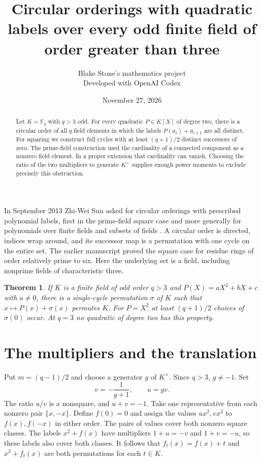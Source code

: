 \documentclass[11pt]{article}
\title{Circular orderings with quadratic labels over every odd finite field of order greater than three}
\author{Blake Stone's mathematics project\\\small Developed with OpenAI Codex}
\date{November 27, 2026}
\newtheorem{theorem}{Theorem}
\newcommand{\F}{\mathbb F}
\begin{document}
\maketitle
\begin{abstract}
Let $K=\F_q$ with $q>3$ odd. For every quadratic $P\in K[X]$ of degree two, there is a circular order of all $q$ field elements in which the labels $P(a_i)+a_{i+1}$ are all distinct. For squaring we construct full cycles with at least $(q+1)/2$ distinct successors of zero. The prime-field construction used the cardinality of a connected component as a nonzero field element. In a proper extension that cardinality can vanish. Choosing the ratio of the two multipliers to generate $K^\times$ supplies enough power moments to exclude precisely this obstruction.
\end{abstract}

In September 2013 Zhi-Wei Sun asked for circular orderings with prescribed polynomial labels, first in the prime-field square case and more generally for polynomials over finite fields and subsets of fields \cite{sun,oeis}. A circular order is directed, indices wrap around, and its successor map is a permutation with one cycle on the entire set. The earlier manuscript \cite{prime} proved the square case for residue rings of order relatively prime to six. Here the underlying set is a field, including nonprime fields of characteristic three.

\begin{theorem}\label{th:main}
If $K$ is a finite field of odd order $q>3$ and $P(X)=aX^2+bX+c$ with $a\ne0$, there is a single-cycle permutation $\sigma$ of $K$ such that $x\mapsto P(x)+\sigma(x)$ permutes $K$. For $P=X^2$ at least $(q+1)/2$ choices of $\sigma(0)$ occur. At $q=3$ no quadratic of degree two has this property.
\end{theorem}

\section*{The multipliers and the translation}
Put $m=(q-1)/2$ and choose a generator $g$ of $K^\times$. Since $q>3$, $g\ne-1$. Set
\[
 v=-\frac1{g+1},\qquad u=gv .
\]
The ratio $u/v$ is a nonsquare, and $u+v=-1$. Take one representative from each nonzero pair $\{x,-x\}$. Define $f(0)=0$ and assign the values $ux^2,vx^2$ to $f(x),f(-x)$ in either order. The pairs of values cover both nonzero square classes. The labels $x^2+f(x)$ have multipliers $1+u=-v$ and $1+v=-u$, so these labels also cover both classes. It follows that $f_t(x)=f(x)+t$ and $x^2+f_t(x)$ are both permutations for each $t\in K$.
\end{document}
